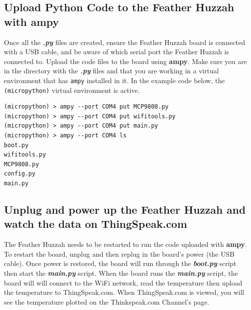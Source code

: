 \documentclass{book}
\begin{document}
    
        \subsection{\texorpdfstring{Upload Python Code to the Feather Huzzah
with
\textbf{ampy}}{Upload Python Code to the Feather Huzzah with ampy}}\label{upload-python-code-to-the-feather-huzzah-with-ampy}
    




    
        Once all the \textbf{\emph{.py}} files are created, ensure the Feather
Huzzah board is connected with a USB cable, and be aware of which serial
port the Feather Huzzah is connected to. Upload the code files to the
board using \textbf{ampy}. Make sure you are in the directory with the
\textbf{\emph{.py}} files and that you are working in a virtual
environment that has \lstinline!ampy! installed in it. In the example
code below, the \lstinline!(micropython)! virtual environment is active.

\begin{lstlisting}
(micropython) > ampy --port COM4 put MCP9808.py
(micropython) > ampy --port COM4 put wifitools.py
(micropython) > ampy --port COM4 put main.py
(micropython) > ampy --port COM4 ls
boot.py
wifitools.py
MCP9808.py
config.py
main.py
\end{lstlisting}
    




    
        \subsection{Unplug and power up the Feather Huzzah and watch the data on
ThingSpeak.com}\label{unplug-and-power-up-the-feather-huzzah-and-watch-the-data-on-thingspeak.com}
    




    
        The Feather Huzzah needs to be restarted to run the code uploaded with
\textbf{ampy}. To restart the board, unplug and then replug in the
board's power (the USB cable). Once power is restored, the board will
run through the \textbf{\emph{boot.py}} script then start the
\textbf{\emph{main.py}} script. When the board runs the
\textbf{\emph{main.py}} script, the board will will connect to the WiFi
network, read the temperature then upload the temperature to
ThingSpeak.com. When ThingSpeak.com is viewed, you will see the
temperature plotted on the Thinkspeak.com Channel's page.
    
\end{document}
